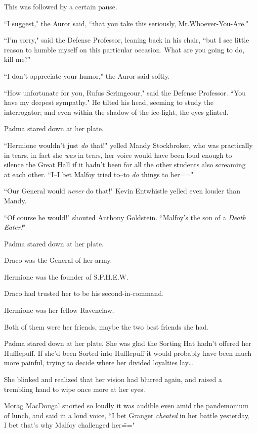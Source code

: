 This was followed by a certain pause.

``I suggest," the Auror said, ``that you take this seriously, Mr.\?Whoever-You-Are."

``I'm sorry," said the Defense Professor, leaning back in his chair, ``but I see little reason to humble myself on this particular occasion. What are you going to do, kill me?"

``I don't appreciate your humor," the Auror said softly.

``How unfortunate for you, Rufus Scrimgeour," said the Defense Professor. ``You have my deepest sympathy." He tilted his head, seeming to study the interrogator; and even within the shadow of the ice-light, the eyes glinted.

\later

Padma stared down at her plate.

``Hermione wouldn't just \emph{do} that!" yelled Mandy Stockbroker, who was practically in tears, in fact she \emph{was} in tears, her voice would have been loud enough to silence the Great Hall if it hadn't been for all the other students also screaming at each other. ``I\---I bet Malfoy tried to\---to \emph{do} things to her\==="

``Our General would \emph{never} do that!" Kevin Entwhistle yelled even louder than Mandy.

``Of course he would!" shouted Anthony Goldstein. ``Malfoy's the son of a \emph{Death Eater!}"

Padma stared down at her plate.

Draco was the General of her army.

Hermione was the founder of S.P.H.E.W.

Draco had trusted her to be his second-in-command.

Hermione was her fellow Ravenclaw.

Both of them were her friends, maybe the two best friends she had.

Padma stared down at her plate. She was glad the Sorting Hat hadn't offered her Hufflepuff. If she'd been Sorted into Hufflepuff it would probably have been much more painful, trying to decide where her divided loyalties lay{\ldots}

She blinked and realized that her vision had blurred again, and raised a trembling hand to wipe once more at her eyes.

Morag MacDougal snorted so loudly it was audible even amid the pandemonium of lunch, and said in a loud voice, ``I bet Granger \emph{cheated} in her battle yesterday, I bet that's why Malfoy challenged her\==="

